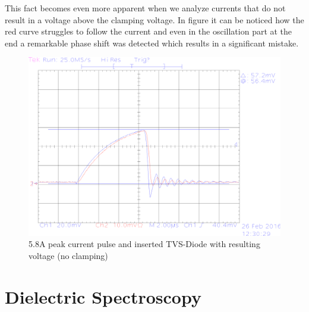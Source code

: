 This fact becomes even more apparent when we analyze currents that do not result in a voltage above the clamping voltage.
In figure it can be noticed how the red curve struggles to follow the current and even in the oscillation part at the end a remarkable phase shift was detected which results in a significant
mistake.


\begin{figure}[ht]
	\centering
	\includegraphics[scale=0.3]{figures/Voltage_Clamping/TEK00008.eps}		
	\caption[Kurze Abbildungsbeschreibung]{5.8A peak current pulse and inserted TVS-Diode with resulting voltage (no clamping)} 
	\label{fig.comparison}
\end{figure}

\section{Dielectric Spectroscopy}
